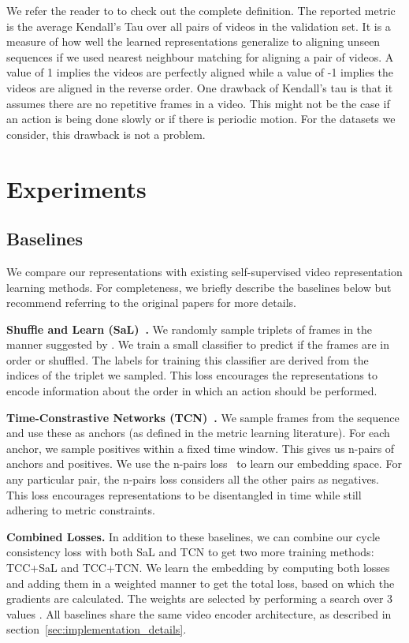 \documentclass[10pt,twocolumn,letterpaper]{article}
\begin{document}
We refer the reader to \cite{wiki:kendallstau} to check out the
complete definition. The reported metric is the average Kendall's Tau
over all pairs of videos in the validation set. It is a measure of how
well the learned representations generalize to aligning unseen
sequences if we used nearest neighbour matching for aligning a pair of
videos. A value of 1 implies the videos are perfectly aligned while a
value of -1 implies the videos are aligned in the reverse order. One
drawback of Kendall's tau is that it assumes there are no repetitive frames in a video. This might not be the case if an action is
being done slowly or if there is periodic motion. For the datasets we
consider, this drawback is not a problem. \section{Experiments}

\subsection{Baselines}
\label{sec:methods}
We compare our representations with existing self-supervised video representation learning methods. For completeness, we briefly describe the baselines below but recommend referring to the original papers for more details. 

\noindent\textbf{Shuffle and Learn (SaL)~\cite{misra2016shuffle}.} We randomly sample triplets of frames in the manner suggested by \cite{misra2016shuffle}. We train a small classifier to predict if the frames are in order or shuffled. The labels for training this classifier are derived from the indices of the triplet we sampled. This loss encourages the representations to encode information about the order in which an action should be performed.

\noindent\textbf{Time-Constrastive Networks (TCN)~\cite{Sermanet2017TCN}.} We sample  frames from the sequence and use these as anchors (as defined in the metric learning literature). For each anchor, we sample positives within a fixed time window. This gives us n-pairs of anchors and positives. We use the n-pairs loss~\cite{sohn2016improved} to learn our embedding space. For any particular pair, the n-pairs loss considers all the other pairs as negatives. This loss encourages representations to be disentangled in time while still adhering to metric constraints.


\noindent\textbf{Combined Losses.} In addition to these baselines, we can combine our cycle consistency loss with both SaL and TCN to get two more training methods: TCC+SaL and TCC+TCN. We learn the embedding by computing both losses and adding them in a weighted manner to get the total loss, based on which the gradients are calculated. The weights are selected by performing a search over 3 values . All baselines share the same video encoder architecture, as described in section~\ref{sec:implementation_details}.
\end{document}
